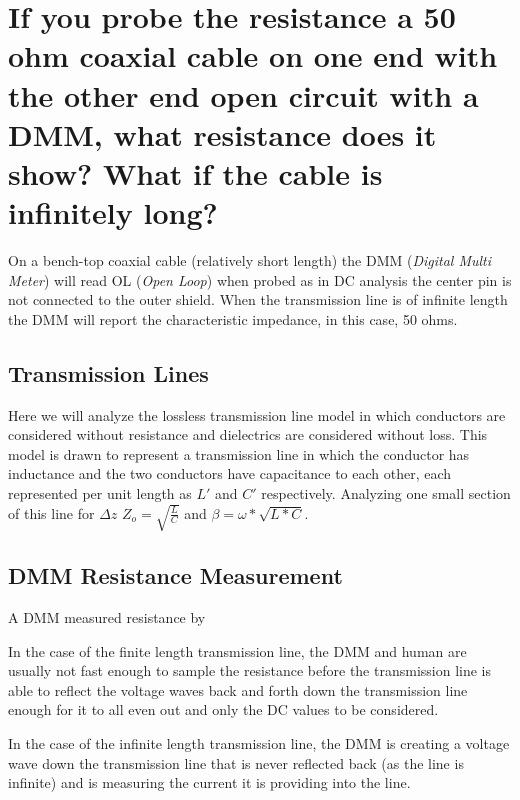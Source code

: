 \documentclass[main.tex]{subfiles}
\begin{document}
\section{If you probe the resistance a 50 ohm coaxial cable on one end with the other end open circuit with a DMM, what resistance does it show? What if the cable is infinitely long?}

\spoilerline


\noindent On a bench-top coaxial cable (relatively short length) the DMM (\textit{Digital Multi Meter}) will read OL (\textit{Open Loop}) when probed as in DC analysis the center pin is not connected to the outer shield. When the transmission line is of infinite length the DMM will report the characteristic impedance, in this case, 50 ohms.

\subsection{Transmission Lines}
Here we will analyze the lossless transmission line model in which conductors are considered without resistance and dielectrics are considered without loss. This model is drawn to represent a transmission line in which the conductor has inductance and the two conductors have capacitance to each other, each represented per unit length as $L\prime$ and $C\prime$ respectively.
Analyzing one small section of this line for $\Delta z$ 
$Z_o = \sqrt{\frac{L}{C}}$ and $\beta = \omega * \sqrt{L*C}$.

\subsection{DMM Resistance Measurement}
A DMM measured resistance by 

In the case of the finite length transmission line, the DMM and human are usually not fast enough to sample the resistance before the transmission line is able to reflect the voltage waves back and forth down the transmission line enough for it to all even out and only the DC values to be considered.

In the case of the infinite length transmission line, the DMM is creating a voltage wave down the transmission line that is never reflected back (as the line is infinite) and is measuring the current it is providing into the line. 
\end{document}
